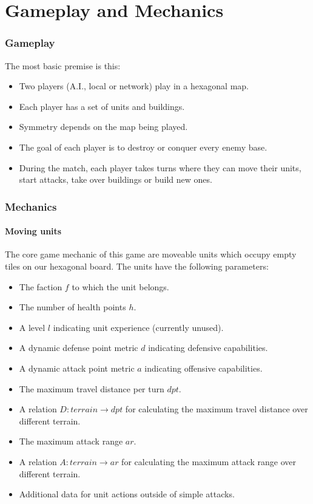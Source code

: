 \part{Gameplay and Mechanics}
\section{Gameplay}
The most basic premise is this:

\begin{itemize}
\item Two players (A.I., local or network) play in a hexagonal map.
\item Each player has a set of units and buildings.
\item Symmetry depends on the map being played.
\item The goal of each player is to destroy or conquer every enemy base.
\item During the match, each player takes turns where they can move their units, start attacks, take over buildings or build new ones.
\end{itemize}
\section{Mechanics}
\subsection{Moving units} %
The core game mechanic of this game are moveable units which occupy empty tiles on our hexagonal board.
The units have the following parameters:

\begin{itemize}
    \item The faction $f$ to which the unit belongs.
    \item The number of health points $h$.
    \item A level $l$ indicating unit experience (currently unused).
    \item A dynamic defense point metric $d$ indicating defensive capabilities.
    \item A dynamic attack point metric $a$ indicating offensive capabilities.
    \item The maximum travel distance per turn $dpt$.
    \item A relation $D: terrain \to dpt$ for calculating the maximum travel distance over different terrain.
    \item The maximum attack range $ar$.
    \item A relation $A: terrain \to ar$ for calculating the maximum attack range over different terrain.
    \item Additional data for unit actions outside of simple attacks.
\end{itemize}
